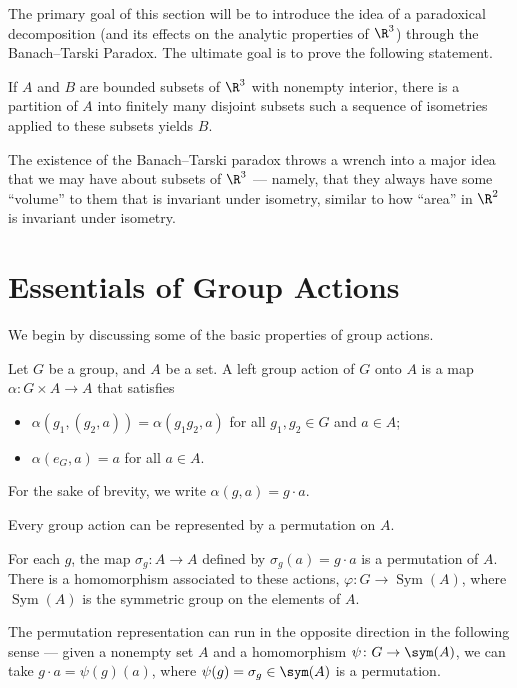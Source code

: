 The primary goal of this section will be to introduce the idea of a paradoxical decomposition (and its effects on the analytic properties of $\R^3$) through the Banach--Tarski Paradox. The ultimate goal is to prove the following statement.
\begin{proposition}
  If $A$ and $B$ are bounded subsets of $\R^3$ with nonempty interior, there is a partition of $A$ into finitely many disjoint subsets such a sequence of isometries applied to these subsets yields $B$.\label{prop:banachtarski}
\end{proposition}
The existence of the Banach--Tarski paradox throws a wrench into a major idea that we may have about subsets of $\R^3$ --- namely, that they always have some ``volume'' to them that is invariant under isometry, similar to how ``area'' in $\R^2$ is invariant under isometry.
\section{Essentials of Group Actions}
We begin by discussing some of the basic properties of group actions.
\begin{definition}
  Let $G$ be a group, and $A$ be a set. A left group action of $G$ onto $A$ is a map $\alpha\colon G\times A\rightarrow A$ that satisfies
  \begin{itemize}
    \item $\alpha\left(g_1,\left(g_2,a\right)\right) = \alpha\left(g_1g_2,a\right)$ for all $g_1,g_2\in G$ and $a\in A$;
    \item $\alpha\left(e_G,a\right) = a$ for all $a\in A$.
  \end{itemize}
  For the sake of brevity, we write $\alpha \left(g,a\right) = g\cdot a$.
\end{definition}
Every group action can be represented by a permutation on $A$.
\begin{definition}
  For each $g$, the map $\sigma_g\colon A\rightarrow A$ defined by $\sigma_g\left(a\right) = g\cdot a$ is a permutation of $A$. There is a homomorphism associated to these actions, $\varphi\colon G\rightarrow \operatorname{Sym}(A)$, where $\operatorname{Sym}(A)$ is the symmetric group on the elements of $A$.
\end{definition}
The permutation representation can run in the opposite direction in the following sense --- given a nonempty set $A$ and a homomorphism $\psi\colon G\rightarrow \sym(A)$, we can take $g\cdot a = \psi(g)(a)$, where $\psi(g) = \sigma_g\in \sym(A)$ is a permutation.\newline

